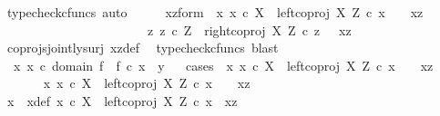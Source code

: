 \begin{isabellebody}
\ {\isacharparenleft}{\kern0pt}typecheck{\isacharunderscore}{\kern0pt}cfuncs{\isacharcomma}{\kern0pt}\ auto{\isacharparenright}{\kern0pt}\isanewline
\ \ \isamarkupfalse%
\ \isamarkupfalse%
\ xz{\isacharunderscore}{\kern0pt}form{\isacharcolon}{\kern0pt}\ {\isachardoublequoteopen}{\isacharparenleft}{\kern0pt}{\isasymexists}\ x{\isachardot}{\kern0pt}\ x\ {\isasymin}\isactrlsub c\ X\ {\isasymand}\ left{\isacharunderscore}{\kern0pt}coproj\ X\ Z\ {\isasymcirc}\isactrlsub c\ x\ {\isacharequal}{\kern0pt}\ \ \ xz{\isacharparenright}{\kern0pt}\ {\isasymor}\ \ \isanewline
\ \ \ \ \ \ \ \ \ \ \ \ \ \ \ \ \ \ \ \ \ \ {\isacharparenleft}{\kern0pt}{\isasymexists}\ z{\isachardot}{\kern0pt}\ z\ {\isasymin}\isactrlsub c\ Z\ {\isasymand}\ right{\isacharunderscore}{\kern0pt}coproj\ X\ Z\ {\isasymcirc}\isactrlsub c\ z\ {\isacharequal}{\kern0pt}\ \ xz{\isacharparenright}{\kern0pt}{\isachardoublequoteclose}\isanewline
\ \ \ \ \isamarkupfalse%
\ coprojs{\isacharunderscore}{\kern0pt}jointly{\isacharunderscore}{\kern0pt}surj\ xz{\isacharunderscore}{\kern0pt}def\ \isamarkupfalse%
\ {\isacharparenleft}{\kern0pt}typecheck{\isacharunderscore}{\kern0pt}cfuncs{\isacharcomma}{\kern0pt}\ blast{\isacharparenright}{\kern0pt}\isanewline
\ \ \isamarkupfalse%
\ {\isachardoublequoteopen}{\isasymexists}\ x{\isachardot}{\kern0pt}\ x\ {\isasymin}\isactrlsub c\ domain\ f\ {\isasymand}\ f\ {\isasymcirc}\isactrlsub c\ x\ {\isacharequal}{\kern0pt}\ y{\isachardoublequoteclose}\isanewline
\ \ \isamarkupfalse%
{\isacharparenleft}{\kern0pt}cases\ {\isachardoublequoteopen}{\isasymexists}\ x{\isachardot}{\kern0pt}\ x\ {\isasymin}\isactrlsub c\ X\ {\isasymand}\ left{\isacharunderscore}{\kern0pt}coproj\ X\ Z\ {\isasymcirc}\isactrlsub c\ x\ {\isacharequal}{\kern0pt}\ \ \ xz{\isachardoublequoteclose}{\isacharparenright}{\kern0pt}\isanewline
\ \ \ \ \isamarkupfalse%
\ {\isachardoublequoteopen}{\isasymexists}\ x{\isachardot}{\kern0pt}\ x\ {\isasymin}\isactrlsub c\ X\ {\isasymand}\ left{\isacharunderscore}{\kern0pt}coproj\ X\ Z\ {\isasymcirc}\isactrlsub c\ x\ {\isacharequal}{\kern0pt}\ \ \ xz{\isachardoublequoteclose}\isanewline
\ \ \ \ \isamarkupfalse%
\ \isamarkupfalse%
\ x\ \ x{\isacharunderscore}{\kern0pt}def{\isacharcolon}{\kern0pt}\ {\isachardoublequoteopen}x\ {\isasymin}\isactrlsub c\ X\ {\isasymand}\ left{\isacharunderscore}{\kern0pt}coproj\ X\ Z\ {\isasymcirc}\isactrlsub c\ x\ {\isacharequal}{\kern0pt}\ xz{\isachardoublequoteclose}\isanewline

\end{isabellebody}
